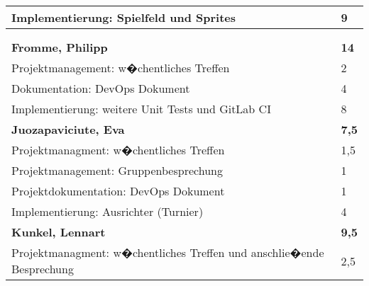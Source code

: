 \documentclass[a4paper,11pt]{scrartcl}
\begin{document}
\begin{longtable}{| p{13.8cm} | C{2.4cm} |}
  Implementierung: Spielfeld und Sprites
	&
  9
	\\
	\hline


	&

	\\
	\hline


	&

	\\
	\hline
	\hline


	\textbf{Fromme, Philipp} & \textbf{14}\\ %
	\hline

	Projektmanagement: w�chentliches Treffen
	&
	2
	\\
	\hline

	Dokumentation: DevOps Dokument
	&
	4
	\\
	\hline

  Implementierung: weitere Unit Tests und GitLab CI
	&
  8
	\\
	\hline
	\hline


	\textbf{Juozapaviciute, Eva} & \textbf{7,5}\\ %
	\hline

  Projektmanagment: w�chentliches Treffen
	&
  1,5
	\\
	\hline

  Projektmanagement: Gruppenbesprechung
	&
  1
	\\
	\hline

  Projektdokumentation: DevOps Dokument
	&
  1
	\\
	\hline

  Implementierung: Ausrichter (Turnier)
	&
  4
	\\
	\hline
	\hline


	\textbf{Kunkel, Lennart} & \textbf{9,5}\\ %
	\hline

  Projektmanagment: w�chentliches Treffen und anschlie�ende Besprechung
	&
  2,5
	\\
	\hline


\end{longtable}
\end{document}

